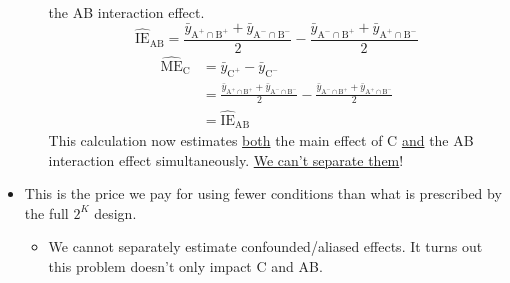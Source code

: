 \begin{itemize}
\begin{itemize}
                        the AB interaction effect.
                        \[ \widehat{\text{IE}}_{\text{AB}}
                              =\frac{\bar{y}_{\text{A}^+\cap \text{B}^+}+\bar{y}_{\text{A}^-\cap \text{B}^-}}{2}-\frac{\bar{y}_{\text{A}^-\cap \text{B}^+}+\bar{y}_{\text{A}^+\cap \text{B}^-}}{2} \]
                        \begin{align*}
                              \widehat{\text{ME}}_{\text{C}}
                               & =\bar{y}_{\text{C}^+}-\bar{y}_{\text{C}^-}                                                                                                                           \\
                               & =\frac{\bar{y}_{\text{A}^+\cap \text{B}^+}+\bar{y}_{\text{A}^-\cap \text{B}^-}}{2}-\frac{\bar{y}_{\text{A}^-\cap \text{B}^+}+\bar{y}_{\text{A}^+\cap \text{B}^-}}{2} \\
                               & =\widehat{\text{IE}}_{\text{AB}}
                        \end{align*}
                        This calculation now estimates \underline{both} the main effect of C \underline{and} the AB interaction effect simultaneously. \underline{We can't separate them}!
            \end{itemize}
      \item This is the price we pay for using fewer conditions than what is prescribed by the full $2^K$ design.
            \begin{itemize}[$\hookrightarrow$]
                  \item We cannot separately estimate confounded/aliased effects. It turns out this problem doesn't only impact C and AB\@.
            \end{itemize}
\end{itemize}
